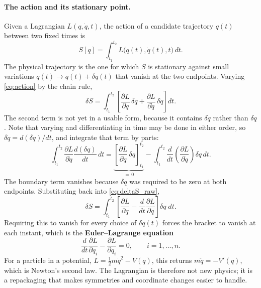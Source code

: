 \documentclass[12pt]{article}
\begin{document}
\paragraph{The action and its stationary point.}  Given a Lagrangian
$L(q,\dot q,t)$, the action of a candidate trajectory $q(t)$ between
two fixed times is
%
\begin{equation}
  S[q] = \int_{t_1}^{t_2} L\bigl(q(t),\dot q(t),t\bigr)\,dt .
  \label{eq:action}
\end{equation}
%
The physical trajectory is the one for which $S$ is stationary against
small variations $q(t) \to q(t) + \delta q(t)$ that vanish at the two
endpoints.  Varying \eqref{eq:action} by the chain rule,
%
\begin{equation}
  \delta S = \int_{t_1}^{t_2}\!
    \left[\frac{\partial L}{\partial q}\,\delta q
        + \frac{\partial L}{\partial\dot q}\,\delta\dot q\right] dt .
  \label{eq:deltaS_raw}
\end{equation}
%
The second term is not yet in a usable form, because it contains
$\delta\dot q$ rather than $\delta q$.  Note that varying and
differentiating in time may be done in either order, so
$\delta\dot q = d(\delta q)/dt$, and integrate that term by parts:
%
\begin{equation}
  \int_{t_1}^{t_2}\!\frac{\partial L}{\partial\dot q}
     \frac{d(\delta q)}{dt}\,dt
   = \underbrace{\left[\frac{\partial L}{\partial\dot q}\,
       \delta q\right]_{t_1}^{t_2}}_{=\,0}
   - \int_{t_1}^{t_2}\!\frac{d}{dt}\!
     \left(\frac{\partial L}{\partial\dot q}\right)\delta q\,dt .
\end{equation}
%
The boundary term vanishes because $\delta q$ was required to be zero
at both endpoints.  Substituting back into \eqref{eq:deltaS_raw},
%
\begin{equation}
  \delta S = \int_{t_1}^{t_2}\!
    \left[\frac{\partial L}{\partial q}
        - \frac{d}{dt}\frac{\partial L}{\partial\dot q}\right]
    \delta q \; dt .
\end{equation}
%
Requiring this to vanish for every choice of $\delta q(t)$ forces the
bracket to vanish at each instant, which is the \textbf{Euler--Lagrange
equation}
%
\begin{equation}
  \frac{d}{dt}\frac{\partial L}{\partial\dot q_i}
    - \frac{\partial L}{\partial q_i} = 0 ,
  \qquad i = 1,\ldots,n .
  \label{eq:euler_lagrange}
\end{equation}
%
For a particle in a potential, $L = \tfrac12 m\dot q^2 - V(q)$, this
returns $m\ddot q = -V'(q)$, which is Newton's second law.  The
Lagrangian is therefore not new physics; it is a repackaging that makes
symmetries and coordinate changes easier to handle.
\end{document}
